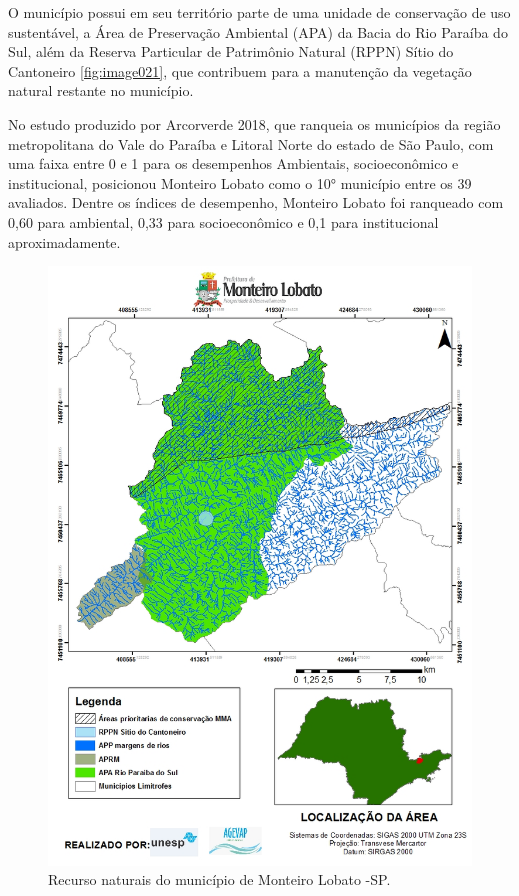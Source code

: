 O município possui em seu território parte de uma unidade de conservação de uso sustentável, a Área de Preservação Ambiental (APA) da Bacia do Rio Paraíba do Sul, além da Reserva Particular de Patrimônio Natural (RPPN) Sítio do Cantoneiro \autoref{fig:image021}, que contribuem para a manutenção da vegetação natural restante no município. 

No estudo produzido por Arcorverde 2018, que ranqueia os municípios da região metropolitana do Vale do Paraíba e Litoral Norte do estado de São Paulo, com uma faixa entre 0 e 1 para os desempenhos Ambientais, socioeconômico e institucional, posicionou Monteiro Lobato como o 10° município entre os 39 avaliados.   Dentre os índices de desempenho, Monteiro Lobato foi ranqueado com 0,60 para ambiental, 0,33 para socioeconômico e 0,1 para institucional ~\cite{arcoverdeproposiccao} aproximadamente. 
\newpage
\begin{figure}[h!]
	\centering
	\includegraphics[width=1\linewidth]{produtos/proddois/image021}
	\caption{Recurso naturais do município de Monteiro Lobato -SP.}
	\label{fig:image021}
\end{figure}
\clearpage

